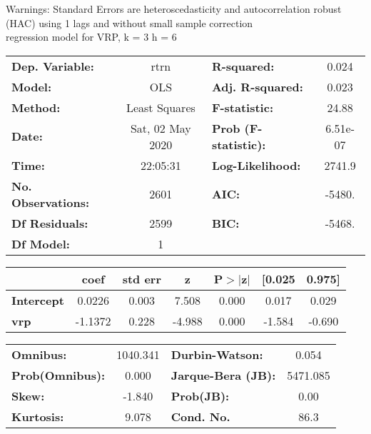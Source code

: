 Warnings: \newline
 [1] Standard Errors are heteroscedasticity and autocorrelation robust (HAC) using 1 lags and without small sample correction\\ 

regression model for VRP, k = 3 h = 6\begin{center}
\begin{tabular}{lclc}
\toprule
\textbf{Dep. Variable:}    &       rtrn       & \textbf{  R-squared:         } &     0.024   \\
\textbf{Model:}            &       OLS        & \textbf{  Adj. R-squared:    } &     0.023   \\
\textbf{Method:}           &  Least Squares   & \textbf{  F-statistic:       } &     24.88   \\
\textbf{Date:}             & Sat, 02 May 2020 & \textbf{  Prob (F-statistic):} &  6.51e-07   \\
\textbf{Time:}             &     22:05:31     & \textbf{  Log-Likelihood:    } &    2741.9   \\
\textbf{No. Observations:} &        2601      & \textbf{  AIC:               } &    -5480.   \\
\textbf{Df Residuals:}     &        2599      & \textbf{  BIC:               } &    -5468.   \\
\textbf{Df Model:}         &           1      & \textbf{                     } &             \\
\bottomrule
\end{tabular}
\begin{tabular}{lcccccc}
                   & \textbf{coef} & \textbf{std err} & \textbf{z} & \textbf{P$> |$z$|$} & \textbf{[0.025} & \textbf{0.975]}  \\
\midrule
\textbf{Intercept} &       0.0226  &        0.003     &     7.508  &         0.000        &        0.017    &        0.029     \\
\textbf{vrp}       &      -1.1372  &        0.228     &    -4.988  &         0.000        &       -1.584    &       -0.690     \\
\bottomrule
\end{tabular}
\begin{tabular}{lclc}
\textbf{Omnibus:}       & 1040.341 & \textbf{  Durbin-Watson:     } &    0.054  \\
\textbf{Prob(Omnibus):} &   0.000  & \textbf{  Jarque-Bera (JB):  } & 5471.085  \\
\textbf{Skew:}          &  -1.840  & \textbf{  Prob(JB):          } &     0.00  \\
\textbf{Kurtosis:}      &   9.078  & \textbf{  Cond. No.          } &     86.3  \\
\bottomrule
\end{tabular}
\end{center}

